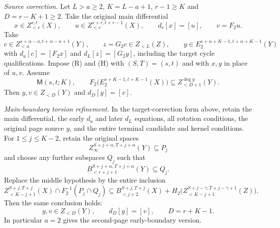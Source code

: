 \begin{corollary}
\textit{Source correction.}
Let $L>a\ge2$, $K=L-a+1$, $r-1\ge K$ and $D=r-K+1\ge2$.
Take the original main differential
\[
x\in Z_{<r}^{s,t}(X),\qquad u\in Z_{<r}^{s+r,t+r-1}(X),
\qquad d_r[x]=[u],\qquad v=F_2u.
\]
Take
\[
c\in Z_{<a}^{s+\alpha-a,t+\alpha-a+1}(Y),\qquad
z=G_2c\in Z_{<L}(Z),\qquad
 y\in E_2^{s+\alpha+K-1,t+\alpha+K-1}(Y)
\]
with $d_a[c]=[F_2x]$ and $d_L[z]=[G_2y]$, including the target
cycle qualifications. Impose (R) and (H) with $(S,T)=(s,t)$ and
with $x,y$ in place of $u,v$. Assume
\[
\mathsf M(s,t;K),\qquad
F_2\bigl(E_2^{s+K-1,t+K-1}(X)\bigr)
 \subseteq Z_{<D+1}^{\deg y}(Y).
\]
Then $y,v\in Z_{<D}(Y)$ and $d_D[y]=[v]$.

\textit{Main-boundary torsion refinement.}
In the target-correction form above,
retain the main differential, the early $d_a$ and later $d_L$
equations, all rotation conditions, the original page source $y$,
and the entire terminal candidate and kernel conditions.
For $1\le j\le K-2$, retain the original spaces
\[
Z_\infty^{S+j+\alpha,T+j+\alpha}(Y)\subseteq P_j
\]
and choose any further subspaces $Q_j$ such that
\[
B_{<r+j+1}^{S+j+\alpha,T+j+\alpha}(Y)\subseteq Q_j.
\]
Replace the middle hypothesis by the entire inclusion
\[
Z_{<K-j+1}^{S+j,T+j}(X)\cap F_2^{-1}(P_j\cap Q_j)
\subseteq B_{<j+2}^{S+j,T+j}(X)
 +H_2\bigl(Z_{<K-j+1}^{S+j-\gamma,T+j-\gamma+1}(Z)\bigr).
\]
Then the same conclusion holds:
\[
y,v\in Z_{<D}(Y),\qquad d_D[y]=[v],\qquad D=r+K-1.
\]
In particular $a=2$ gives the second-page early-boundary version.
\end{corollary}
